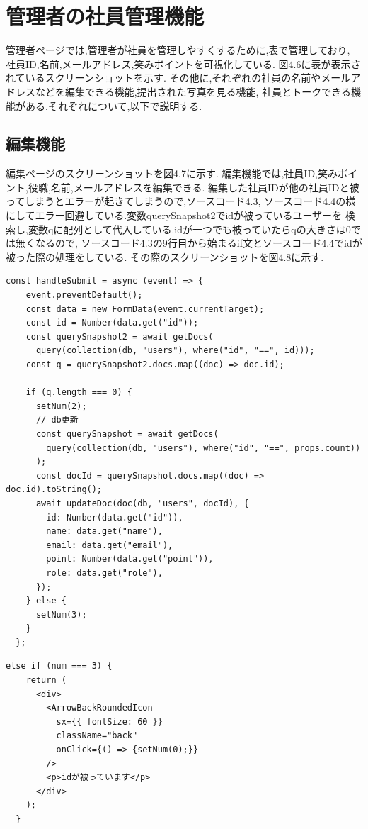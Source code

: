 \section{管理者の社員管理機能}
\label{chp:tex_admin}
管理者ページでは,管理者が社員を管理しやすくするために,表で管理しており,
社員ID,名前,メールアドレス,笑みポイントを可視化している.
図4.6に表が表示されているスクリーンショットを示す.
その他に,それぞれの社員の名前やメールアドレスなどを編集できる機能,提出された写真を見る機能,
社員とトークできる機能がある.それぞれについて,以下で説明する.

\subsection{編集機能}
編集ページのスクリーンショットを図4.7に示す.
編集機能では,社員ID,笑みポイント,役職,名前,メールアドレスを編集できる.
編集した社員IDが他の社員IDと被ってしまうとエラーが起きてしまうので,ソースコード4.3,
ソースコード4.4の様にしてエラー回避している.変数querySnapshot2でidが被っているユーザーを
検索し,変数qに配列として代入している.idが一つでも被っていたらqの大きさは0では無くなるので,
ソースコード4.3の9行目から始まるif文とソースコード4.4でidが被った際の処理をしている.
その際のスクリーンショットを図4.8に示す.

\clearpage

\begin{lstlisting}[caption=社員IDが被った時の処理]
  const handleSubmit = async (event) => {
    event.preventDefault();
    const data = new FormData(event.currentTarget);
    const id = Number(data.get("id"));
    const querySnapshot2 = await getDocs(
      query(collection(db, "users"), where("id", "==", id)));
    const q = querySnapshot2.docs.map((doc) => doc.id);

    if (q.length === 0) {
      setNum(2);
      // db更新
      const querySnapshot = await getDocs(
        query(collection(db, "users"), where("id", "==", props.count))
      );
      const docId = querySnapshot.docs.map((doc) => doc.id).toString();
      await updateDoc(doc(db, "users", docId), {
        id: Number(data.get("id")),
        name: data.get("name"),
        email: data.get("email"),
        point: Number(data.get("point")),
        role: data.get("role"),
      });
    } else {
      setNum(3);
    }
  };
\end{lstlisting}

\begin{lstlisting}[caption=社員IDが被った時の処理]
  else if (num === 3) {
    return (
      <div>
        <ArrowBackRoundedIcon
          sx={{ fontSize: 60 }}
          className="back"
          onClick={() => {setNum(0);}}
        />
        <p>idが被っています</p>
      </div>
    );
  }
\end{lstlisting}

